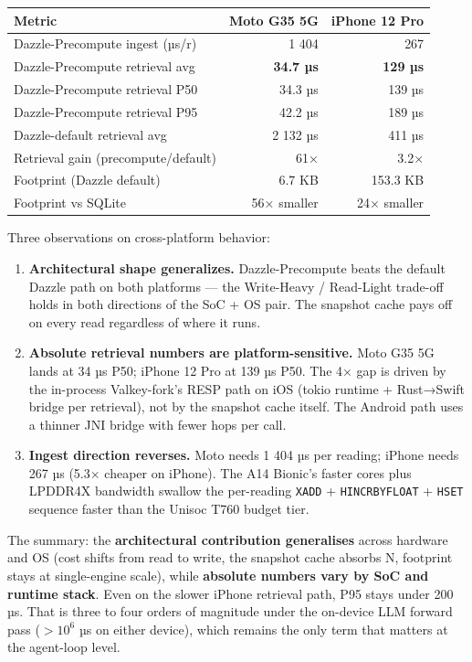 {\def\LTcaptype{none} %
\begin{longtable}[]{@{}lrr@{}}
\toprule\noalign{}
Metric & Moto G35 5G & iPhone 12 Pro \\
\midrule\noalign{}
\endhead
\bottomrule\noalign{}
\endlastfoot
Dazzle-Precompute ingest (µs/r) & 1 404 & 267 \\
Dazzle-Precompute retrieval avg & \textbf{34.7 µs} & \textbf{129 µs} \\
Dazzle-Precompute retrieval P50 & 34.3 µs & 139 µs \\
Dazzle-Precompute retrieval P95 & 42.2 µs & 189 µs \\
Dazzle-default retrieval avg & 2 132 µs & 411 µs \\
Retrieval gain (precompute/default) & 61× & 3.2× \\
Footprint (Dazzle default) & 6.7 KB & 153.3 KB \\
Footprint vs SQLite & 56× smaller & 24× smaller \\
\end{longtable}
}

Three observations on cross-platform behavior:

\begin{enumerate}
\def\labelenumi{\arabic{enumi}.}
\item
  \textbf{Architectural shape generalizes.} Dazzle-Precompute beats the default
  Dazzle path on both platforms --- the Write-Heavy / Read-Light trade-off holds
  in both directions of the SoC + OS pair. The snapshot cache pays off on every
  read regardless of where it runs.
\item
  \textbf{Absolute retrieval numbers are platform-sensitive.} Moto G35 5G lands
  at 34 µs P50; iPhone 12 Pro at 139 µs P50. The 4× gap is driven by the
  in-process Valkey-fork's RESP path on iOS (tokio runtime + Rust→Swift bridge
  per retrieval), not by the snapshot cache itself. The Android path uses a
  thinner JNI bridge with fewer hops per call.
\item
  \textbf{Ingest direction reverses.} Moto needs 1 404 µs per reading; iPhone
  needs 267 µs (5.3× cheaper on iPhone). The A14 Bionic's faster cores plus
  LPDDR4X bandwidth swallow the per-reading \texttt{XADD} +
  \texttt{HINCRBYFLOAT} + \texttt{HSET} sequence faster than the Unisoc T760
  budget tier.
\end{enumerate}

The summary: the \textbf{architectural contribution generalises} across hardware
and OS (cost shifts from read to write, the snapshot cache absorbs N, footprint
stays at single-engine scale), while \textbf{absolute numbers vary by SoC and
runtime stack}. Even on the slower iPhone retrieval path, P95 stays under 200
µs. That is three to four orders of magnitude under the on-device LLM forward
pass (\(>10^{6}\) µs on either device), which remains the only term that matters
at the agent-loop level.

